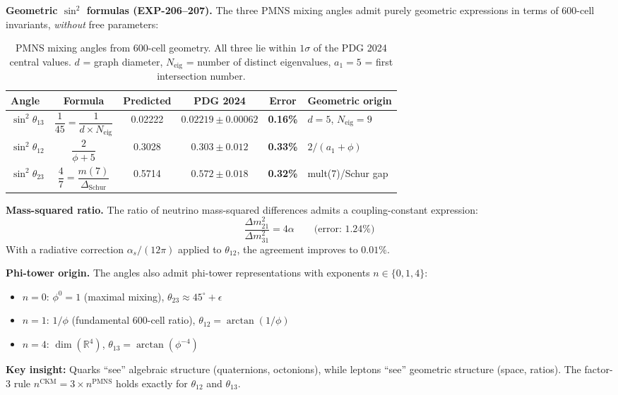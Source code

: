 \documentclass[12pt,a4paper]{article}
\begin{document}
\textbf{Geometric $\sin^2$ formulas (EXP-206--207).} The three PMNS mixing angles admit purely geometric expressions in terms of 600-cell invariants, \emph{without} free parameters:

\begin{table}[H]
\centering
\begin{tabular}{lccccl}
\toprule
\textbf{Angle} & \textbf{Formula} & \textbf{Predicted} & \textbf{PDG 2024} & \textbf{Error} & \textbf{Geometric origin} \\
\midrule
$\sin^2\theta_{13}$ & $\dfrac{1}{45} = \dfrac{1}{d \times N_{\text{eig}}}$ & 0.02222 & $0.02219 \pm 0.00062$ & \textbf{0.16\%} & $d=5$, $N_{\text{eig}}=9$ \\[8pt]
$\sin^2\theta_{12}$ & $\dfrac{2}{\phi + 5}$ & 0.3028 & $0.303 \pm 0.012$ & \textbf{0.33\%} & $2/(a_1 + \phi)$ \\[8pt]
$\sin^2\theta_{23}$ & $\dfrac{4}{7} = \dfrac{m(7)}{\Delta_{\text{Schur}}}$ & 0.5714 & $0.572 \pm 0.018$ & \textbf{0.32\%} & mult(7)/Schur gap \\
\bottomrule
\end{tabular}
\caption{PMNS mixing angles from 600-cell geometry. All three lie within $1\sigma$ of the PDG 2024 central values. $d$ = graph diameter, $N_{\text{eig}}$ = number of distinct eigenvalues, $a_1 = 5$ = first intersection number.}
\label{tab:pmns_geometric}
\end{table}

\textbf{Mass-squared ratio.} The ratio of neutrino mass-squared differences admits a coupling-constant expression:
\begin{equation}
\frac{\Delta m^2_{21}}{\Delta m^2_{31}} = 4\alpha \qquad \text{(error: 1.24\%)}
\end{equation}
With a radiative correction $\alpha_s/(12\pi)$ applied to $\theta_{12}$, the agreement improves to $0.01\%$.

\textbf{Phi-tower origin.} The angles also admit phi-tower representations with exponents $n \in \{0, 1, 4\}$:
\begin{itemize}
    \item $n=0$: $\phi^0 = 1$ (maximal mixing), $\theta_{23} \approx 45^\circ + \epsilon$
    \item $n=1$: $1/\phi$ (fundamental 600-cell ratio), $\theta_{12} = \arctan(1/\phi)$
    \item $n=4$: $\dim(\mathbb{R}^4)$, $\theta_{13} = \arctan(\phi^{-4})$
\end{itemize}

\textbf{Key insight:} Quarks ``see'' algebraic structure (quaternions, octonions), while leptons ``see'' geometric structure (space, ratios). The factor-3 rule $n^{\text{CKM}} = 3 \times n^{\text{PMNS}}$ holds exactly for $\theta_{12}$ and $\theta_{13}$.
\end{document}
